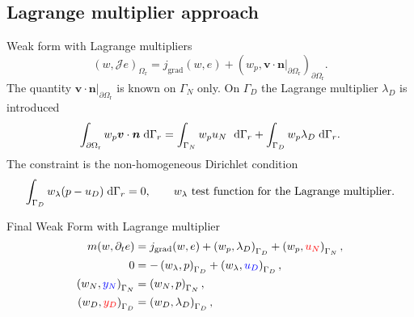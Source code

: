 \documentclass[aspectratio=169]{ISAE-Beamer}
\begin{document}
\subsection{Lagrange multiplier approach}

\begin{frame}{Weak form with Lagrange multipliers}
\setlength{\belowdisplayskip}{1pt}
\setlength{\abovedisplayskip}{1pt}
\begin{equation*}
\left(w, \mathcal{J} e \right)_{\Omega_{\text{r}}} =  j_{\text{grad}}(w, e) + \left(w_p, \bm{v}\cdot\bm{n}\vert_{\partial \Omega_{\text{r}}} \right)_{\partial \Omega_{\text{r}}}.
\end{equation*}
	The quantity $\bm{v}\cdot\bm{n}\vert_{\partial \Omega_{\text{r}}}$ is known on $\Gamma_N$ only. On $\Gamma_D$ the Lagrange multiplier $\lambda_D$ is introduced 
	\begin{equation*}
	\label{eq:bdint_dae}
	\int_{\partial \Omega_{\text{r}}} w_p \bm{v} \cdot \bm{n} \d{\Gamma_r} = \int_{\Gamma_N} w_p u_N \ \d{\Gamma_r} + \int_{\Gamma_D} w_p \lambda_D \d{\Gamma_r}.
	\end{equation*}
	The constraint  is the non-homogeneous Dirichlet condition
	\begin{equation*}
	\label{eq:wf_con}
	\int_{\Gamma_D} w_\lambda (p - u_D) \d{\Gamma_r} = 0, \qquad \text{$w_\lambda$ test function for the Lagrange multiplier.}
	\end{equation*}
	
	\begin{exampleblock}{Final Weak Form with Lagrange multiplier}
	\begin{equation*}
	\begin{aligned}
	m(w, \partial_t{e}) &= j_{\text{grad}}(w, e) + \left(w_p, \lambda_D \right)_{\Gamma_D} + \left(w_p, \textcolor{red}{u_N} \right)_{\Gamma_N}, \\
	0 &= - \left(w_\lambda, p \right)_{\Gamma_D} + \left(w_\lambda, \textcolor{blue}{u_D} \right)_{\Gamma_D}, \\
	\left(w_N, \textcolor{blue}{y_N} \right)_{\Gamma_N} &= \left(w_N, p \right)_{\Gamma_N}, \\
	\left(w_D, \textcolor{red}{y_D} \right)_{\Gamma_D} &= \left(w_D, \lambda_D \right)_{\Gamma_D}, 
	\end{aligned}
	\end{equation*}
	\end{exampleblock}


\end{frame}
\end{document}
